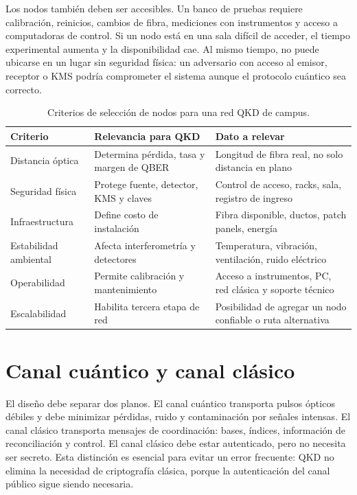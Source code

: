 Los nodos también deben ser accesibles. Un banco de pruebas requiere calibración, reinicios, cambios de fibra, mediciones con instrumentos y acceso a computadoras de control. Si un nodo está en una sala difícil de acceder, el tiempo experimental aumenta y la disponibilidad cae. Al mismo tiempo, no puede ubicarse en un lugar sin seguridad física: un adversario con acceso al emisor, receptor o KMS podría comprometer el sistema aunque el protocolo cuántico sea correcto.

\begin{table}[H]
  \centering
  \begin{tabularx}{\textwidth}{p{}XX}
    \toprule
    Criterio & Relevancia para QKD & Dato a relevar \\
    \midrule
    Distancia óptica & Determina pérdida, tasa y margen de QBER & Longitud de fibra real, no solo distancia en plano \\
    Seguridad física & Protege fuente, detector, KMS y claves & Control de acceso, racks, sala, registro de ingreso \\
    Infraestructura & Define costo de instalación & Fibra disponible, ductos, patch panels, energía \\
    Estabilidad ambiental & Afecta interferometría y detectores & Temperatura, vibración, ventilación, ruido eléctrico \\
    Operabilidad & Permite calibración y mantenimiento & Acceso a instrumentos, PC, red clásica y soporte técnico \\
    Escalabilidad & Habilita tercera etapa de red & Posibilidad de agregar un nodo confiable o ruta alternativa \\
    \bottomrule
  \end{tabularx}
  \caption{Criterios de selección de nodos para una red QKD de campus.}
  \label{tab:criterios_nodos}
\end{table}

\section{Canal cuántico y canal clásico}

El diseño debe separar dos planos. El canal cuántico transporta pulsos ópticos débiles y debe minimizar pérdidas, ruido y contaminación por señales intensas. El canal clásico transporta mensajes de coordinación: bases, índices, información de reconciliación y control. El canal clásico debe estar autenticado, pero no necesita ser secreto. Esta distinción es esencial para evitar un error frecuente: QKD no elimina la necesidad de criptografía clásica, porque la autenticación del canal público sigue siendo necesaria.

